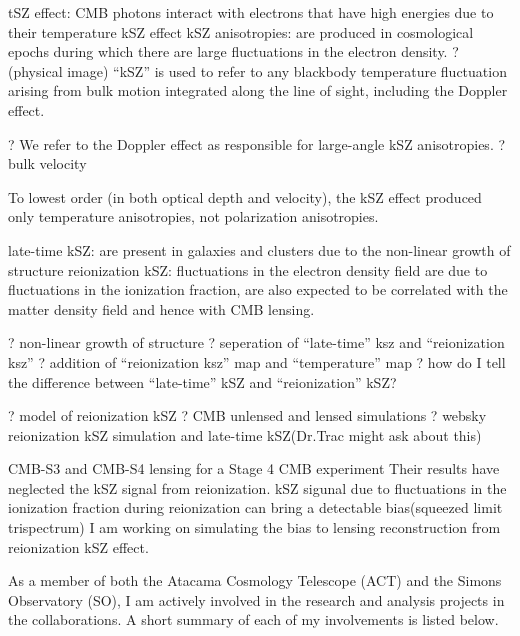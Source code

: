 \documentclass[12pt, notitlepage, onecolumn, amsmath, amssymb, aps]{revtex4-1}
\begin{document}
tSZ effect: CMB photons interact with electrons that have high energies due to their temperature
kSZ effect 
kSZ anisotropies: are produced in cosmological epochs during which there are large fluctuations in the electron density. ? (physical image)
``kSZ'' is used to refer to any blackbody temperature fluctuation arising from bulk motion integrated along the line of sight, including the Doppler effect.

? We refer to the Doppler effect as responsible for large-angle kSZ anisotropies.
? bulk velocity


To lowest order (in both optical depth and velocity), the kSZ effect produced only temperature anisotropies, not polarization anisotropies. 



late-time kSZ: are present in galaxies and clusters due to the non-linear growth of structure
reionization kSZ: fluctuations in the electron density field are due to fluctuations in the ionization fraction, are also expected to be correlated with the matter density field and hence with CMB lensing. 

? non-linear growth of structure
? seperation of ``late-time'' ksz and ``reionization ksz''
? addition of ``reionization ksz'' map and ``temperature'' map
? how do I tell the difference between ``late-time'' kSZ and ``reionization'' kSZ?

? model of reionization kSZ
? CMB unlensed and lensed simulations
? websky reionization kSZ simulation and late-time kSZ(Dr.Trac might ask about this)

CMB-S3 and CMB-S4 lensing 
for a Stage 4 CMB experiment
Their results have neglected the kSZ signal from reionization. 
kSZ sigunal due to fluctuations in the ionization fraction during reionization can bring a detectable bias(squeezed limit trispectrum)
I am working on simulating the bias to lensing reconstruction from reionization kSZ effect. 


As a member of both the Atacama Cosmology Telescope (ACT) and the
Simons Observatory (SO), I am actively involved in the research and
analysis projects in the collaborations. A short summary of each of my
involvements is listed below.


\end{document}
